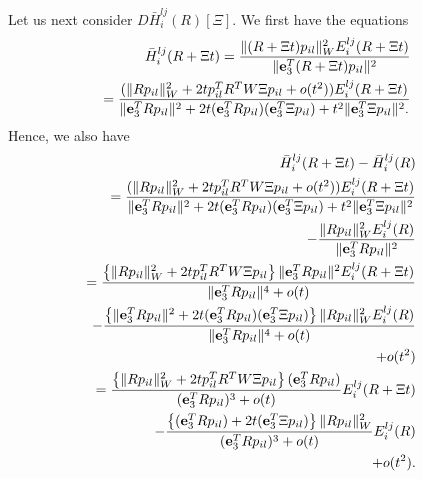 \documentclass[conference,letterpaper]{ieeeconf}
\begin{document}
Let us next consider  
$D \bar H_i^{lj}(R)[\Xi]$. We first have the equations
\begin{eqnarray}
\hspace{-.8cm}&&\bar H^{lj}_i(R + \Xi t) =
\frac{\|(R+\Xi t) p_{il}\|_W^2E^{lj}_i(R + \Xi t)}{\|{\bf e}_3^T (R + \Xi t) p_{il}\|^2}
\nonumber\\
\hspace{-.8cm}&&\hspace{.3cm}= \frac{(\|Rp_{il}\|_W^2 + 2tp_{il}^TR^TW\Xi p_{il} + o(t^2))
E^{lj}_i(R + \Xi t)}{
\|{\bf e}_3^TR p_{il}\|^2 + 2t 
({\bf e}_3^TR p_{il})({\bf e}_3^T\Xi p_{il})
+ t^2 \|{\bf e}_3^T\Xi p_{il}\|^2.
}
\nonumber
\end{eqnarray}
Hence, we also have
\begin{eqnarray}
\hspace{-.8cm}&&\bar H^{lj}_i(R + \Xi t) - \bar H^{lj}_i(R)
\nonumber\\
\hspace{-.8cm}&&= \frac{(\|Rp_{il}\|_W^2 + 2tp_{il}^TR^TW\Xi p_{il} + o(t^2))E^{lj}_i(R + \Xi t)}{
\|{\bf e}_3^TR p_{il}\|^2 + 2t 
({\bf e}_3^TR p_{il})({\bf e}_3^T\Xi p_{il})
+ t^2 \|{\bf e}_3^T\Xi p_{il}\|^2}
\nonumber\\
\hspace{-.8cm}&&\hspace{3cm}- \frac{\|Rp_{il}\|_W^2E^{lj}_i(R)}{\|{\bf e}_3^T R p_{il}\|^2}
\nonumber\\
\hspace{-.8cm}&& =  
\frac{\left\{\|Rp_{il}\|_W^2 + 2tp_{il}^TR^TW\Xi p_{il}\right\}
\|{\bf e}_3^T R p_{il}\|^2
E^{lj}_i(R + \Xi t)}{ \|{\bf e}_3^TR p_{il}\|^4 + o(t)}
\nonumber\\
\hspace{-.8cm}&&
-\frac{\left\{\|{\bf e}_3^TR p_{il}\|^2 + 2t 
({\bf e}_3^TR p_{il})({\bf e}_3^T\Xi p_{il})\right\}
\|Rp_{il}\|_W^2E^{lj}_i(R)
}{\|{\bf e}_3^TR p_{il}\|^4 + o(t)}
\nonumber\\
\hspace{-.8cm}&&\hspace{3cm} + o(t^2)
\nonumber\\
\hspace{-.8cm}&& =  
\frac{\left\{\|Rp_{il}\|_W^2 + 2tp_{il}^TR^TW\Xi p_{il}\right\}
({\bf e}_3^T R p_{il})}{ ({\bf e}_3^TR p_{il})^3 + o(t)}E^{lj}_i(R + \Xi t)
\nonumber\\
\hspace{-.8cm}&&\hspace{1cm}
-\frac{\left\{({\bf e}_3^TR p_{il}) + 2t 
({\bf e}_3^T\Xi p_{il})\right\}
\|Rp_{il}\|_W^2
}{({\bf e}_3^TR p_{il})^3 + o(t)}E^{lj}_i(R)
\nonumber\\
\hspace{-.8cm}&&\hspace{3cm} + o(t^2).
\label{eqn:app1}
\end{eqnarray}
\end{document}
